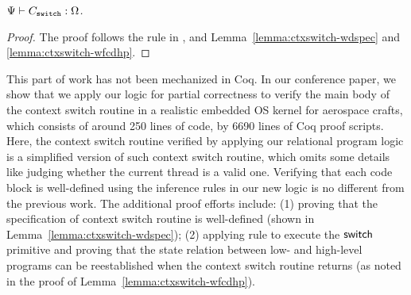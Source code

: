 \begin{theorem}
    \em
    ${\Psi} \vdash {C_{\texttt{switch}}} : {\Omega}$.
\end{theorem}
\begin{proof}
    The proof follows the  rule in 
    \Fig{\ref{fig:Selected Inference Rules for Refinement Verification}}, 
    and Lemma~\ref{lemma:ctxswitch-wdspec}
    and \ref{lemma:ctxswitch-wfcdhp}.
\end{proof}

This part of work has not been mechanized in Coq.
In our conference paper, we show that
we apply our logic 
for partial correctness to verify
the main body of the context switch routine in
a realistic embedded OS kernel for aerospace crafts,
which consists of around 250 lines of \sparc{} code,
by 6690 lines of Coq proof scripts. Here, the
context switch routine verified by applying our
relational program logic is a
simplified version of such context switch routine,
which omits some details like judging whether the
current thread is a valid one.
Verifying that each code block is well-defined
using the inference rules in our new logic is
no different from the previous work.
The additional proof efforts include:
(1) proving that the specification of context
switch routine is well-defined (shown in
Lemma~\ref{lemma:ctxswitch-wdspec});
(2) applying  rule to execute
the $\mathsf{switch}$ primitive and proving that the state
relation between low- and high-level programs
can be reestablished when the context switch routine
returns (as noted in the proof of
Lemma~\ref{lemma:ctxswitch-wfcdhp}).


